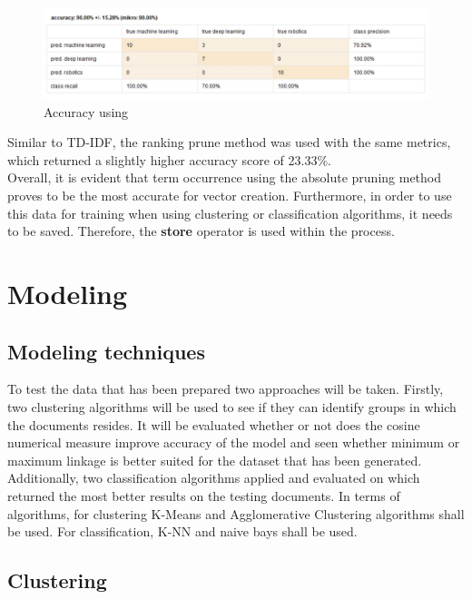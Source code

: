 \begin{figure}[ht]
	\begin{center}
		\advance\leftskip-3cm
		\advance\rightskip-3cm
		\includegraphics[keepaspectratio=true,scale=0.6]{__resources/to.JPG}
		\caption{Accuracy using }
		\label{stop}
	\end{center}
\end{figure} 

Similar to TD-IDF, the ranking prune method was used with the same metrics, which returned a slightly higher accuracy score of 23.33\%.\\
Overall, it is evident that term occurrence using the absolute pruning method proves to be the most accurate for vector creation. Furthermore, in order to use this data for training when using clustering or classification algorithms, it needs to be saved. Therefore, the \textbf{store} operator is used within the process.




\section*{Modeling}

\subsection*{Modeling techniques}
To test the data that has been prepared two approaches will be taken. Firstly, two clustering algorithms will be used to see if they can identify groups in which the documents resides. It will be evaluated whether or not does the cosine numerical measure improve accuracy of the model and seen whether minimum or maximum linkage is better suited for the dataset that has been generated. Additionally, two classification algorithms applied and evaluated on which returned the most better results on the testing documents.
In terms of algorithms, for clustering K-Means and Agglomerative Clustering algorithms shall be used. For classification, K-NN and naive bays shall be used. 
\subsection*{Clustering}
